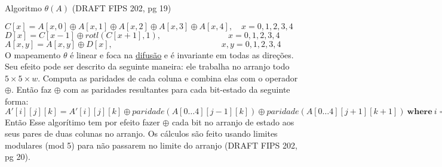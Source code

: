 \documentclass[12pt, a4paper]{article}
\begin{document}
\begin{enumerate}
\begin{enumerate}
Algoritmo $\theta(A)$ (DRAFT FIPS 202, pg 19)

$C[x] = A[x, 0] \oplus A[x, 1] \oplus A[x, 2] \oplus A[x, 3] \oplus A[x, 4] ,
\quad x = 0, 1, 2, 3, 4$\\ $D[x] = C[x-1] \oplus rotl(C[x + 1], 1), \qquad
\qquad  \qquad  \qquad x = 0, 1, 2, 3, 4$\\ $A[x, y] = A[x, y] \oplus D[x] ,
\qquad  \qquad  \qquad  \qquad \qquad  \qquad  \quad x, y = 0, 1, 2, 3, 4$\\

O mapeamento $\theta$ é linear e foca na \underline{difusão} e é invariante em
todas as direções. Seu efeito pode ser descrito da seguinte maneira: ele
trabalha no arranjo todo $5 \times 5 \times w$. Computa as paridades de cada
coluna e combina elas com o operador $\oplus$. Então faz $\oplus$ com as
paridades resultantes para cada bit-estado da seguinte forma: $A'[i][j][k] =
A'[i][j][k] \oplus paridade(A[0\ldots4][j-1][k]) \oplus
paridade(A[0\ldots4][j+1][k+1])\ \textbf{where}\
i=0\ldots4;j=0\ldots4;k=0\ldots(w-1)$ Então Esse algorítimo tem por efeito fazer
$\oplus$ cada bit no arranjo de estado aos seus pares de duas colunas no
arranjo. Os cálculos são feito usando limites modulares (mod 5) para não
passarem no limite do arranjo (DRAFT FIPS 202, pg 20).\\


\end{enumerate}
\end{enumerate}
\end{document}
